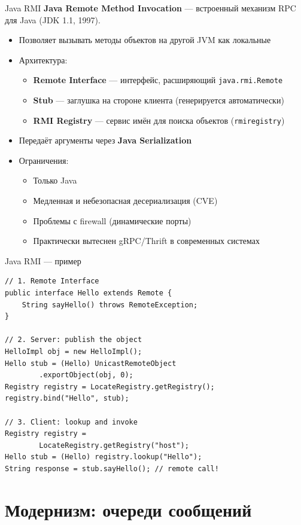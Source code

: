 \documentclass{beamer}
\begin{document}
\begin{frame}{Java RMI}
\textbf{Java Remote Method Invocation} --- встроенный механизм RPC для Java (JDK 1.1, 1997).
\begin{itemize}
  \item Позволяет вызывать методы объектов на другой JVM как локальные
  \item Архитектура:
  \begin{itemize}
    \item \textbf{Remote Interface} --- интерфейс, расширяющий \texttt{java.rmi.Remote}
    \item \textbf{Stub} --- заглушка на стороне клиента (генерируется автоматически)
    \item \textbf{RMI Registry} --- сервис имён для поиска объектов (\texttt{rmiregistry})
  \end{itemize}
  \item Передаёт аргументы через \textbf{Java Serialization}
  \item Ограничения:
  \begin{itemize}
    \item Только Java
    \item Медленная и небезопасная десериализация (CVE)
    \item Проблемы с firewall (динамические порты)
    \item Практически вытеснен gRPC/Thrift в современных системах
  \end{itemize}
\end{itemize}
\end{frame}

\begin{frame}[fragile]{Java RMI --- пример}
\begin{verbatim}
// 1. Remote Interface
public interface Hello extends Remote {
    String sayHello() throws RemoteException;
}

// 2. Server: publish the object
HelloImpl obj = new HelloImpl();
Hello stub = (Hello) UnicastRemoteObject
        .exportObject(obj, 0);
Registry registry = LocateRegistry.getRegistry();
registry.bind("Hello", stub);

// 3. Client: lookup and invoke
Registry registry =
        LocateRegistry.getRegistry("host");
Hello stub = (Hello) registry.lookup("Hello");
String response = stub.sayHello(); // remote call!
\end{verbatim}
\end{frame}

\section{Модернизм: очереди сообщений}
\end{document}
